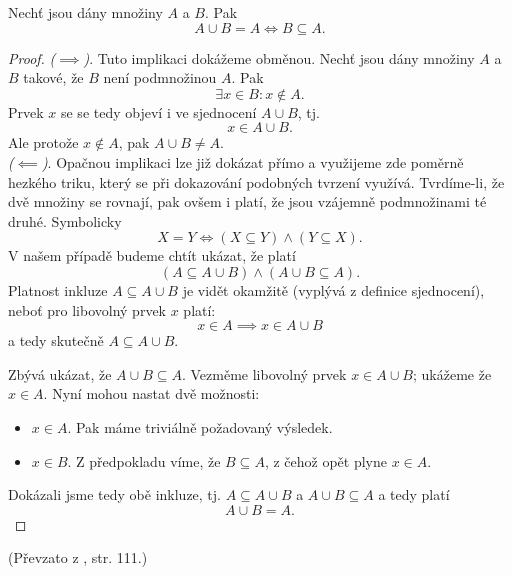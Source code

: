 \begin{proposition}
    Nechť jsou dány množiny $A$ a $B$. Pak
    \begin{equation*}
        A \cup B=A \iff B \subseteq A.
    \end{equation*}
\end{proposition}
\begin{proof}
    \textit{($\implies$)}. Tuto implikaci dokážeme obměnou. Nechť jsou dány množiny $A$ a $B$ takové, že $B$ není podmnožinou $A$. Pak
    \begin{equation*}
        \exists x\in B : x\notin A.
    \end{equation*}
    Prvek $x$ se se tedy objeví i ve sjednocení $A \cup B$, tj.
    \begin{equation*}
        x\in A \cup B.
    \end{equation*}
    Ale protože $x\notin A$, pak $A \cup B \neq A$.\\
    \textit{($\impliedby$)}. Opačnou implikaci lze již dokázat přímo a využijeme zde poměrně hezkého triku, který se při dokazování podobných tvrzení využívá. Tvrdíme-li, že dvě množiny se rovnají, pak ovšem i platí, že jsou vzájemně podmnožinami té druhé. Symbolicky
    \begin{equation*}
        X = Y \iff (X \subseteq Y) \land (Y \subseteq X).
    \end{equation*}
    V našem případě budeme chtít ukázat, že platí
    \begin{equation*}
        (A \subseteq A \cup B) \land (A \cup B \subseteq A).
    \end{equation*}
    Platnost inkluze $A \subseteq A \cup B$ je vidět okamžitě (vyplývá z definice sjednocení), neboť pro libovolný prvek $x$ platí:
    \begin{equation*}
        x \in A \implies x \in A \cup B
    \end{equation*}
    a tedy skutečně $A \subseteq A \cup B$.\par
    Zbývá ukázat, že $A \cup B \subseteq A$. Vezměme libovolný prvek $x \in A \cup B$; ukážeme že $x\in A$. Nyní mohou nastat dvě možnosti:
    \begin{itemize}
        \item $x \in A$. Pak máme triviálně požadovaný výsledek.
        \item $x \in B$. Z předpokladu víme, že $B \subseteq A$, z čehož opět plyne $x\in A$.
    \end{itemize}
    Dokázali jsme tedy obě inkluze, tj. $A \subseteq A \cup B$ a $A \cup B \subseteq A$ a tedy platí
    \begin{equation*}
        A \cup B = A.
    \end{equation*}
\end{proof}
(Převzato z \cite{ChartrandPolimeniZhang2014}, str. 111.)
